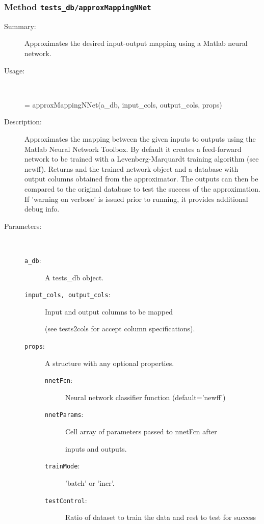 \subsubsection[Method \texttt{approxMappingNNet}]{Method \texttt{tests\_db/approxMappingNNet}}%
%
\label{ref_tests_db__approxMappingNNet}%
\hypertarget{ref_tests_db__approxMappingNNet}{}%
\begin{description}
\item[Summary:]Approximates the desired input-output mapping using a Matlab neural network.
%
\item[Usage:]~%
\begin{lyxcode}%
[an\_approx\_db, a\_nnet] = approxMappingNNet(a\_db, input\_cols, output\_cols, props)
%
\end{lyxcode}%
%
\item[Description:]%
Approximates the mapping between the given inputs to outputs
 using the Matlab Neural Network Toolbox. By default it creates a
 feed-forward network to be trained with a Levenberg-Marquardt training
 algorithm (see newff). Returns and the trained network object and a
 database with output columns obtained from the approximator. The outputs
 can then be compared to the original database to test the success of the
 approximation. If 'warning on verbose' is issued prior to running, it
 provides additional debug info.
\item[Parameters:]~
\begin{description}%
\item[\texttt{a\_db}:]
 A tests\_db object.
\item[\texttt{input\_cols, output\_cols}:]
 Input and output columns to be mapped

(see tests2cols for accept column specifications).
\item[\texttt{props}:]
 A structure with any optional properties.
\begin{description}%
\item[\texttt{nnetFcn}:]
 Neural network classifier function (default='newff')
\item[\texttt{nnetParams}:]
 Cell array of parameters passed to nnetFcn after

inputs and outputs.
\item[\texttt{trainMode}:]
 'batch' or 'incr'.
\item[\texttt{testControl}:]
 Ratio of dataset to train the data and rest to test for success


\end{description}
\end{description}
\end{description}
